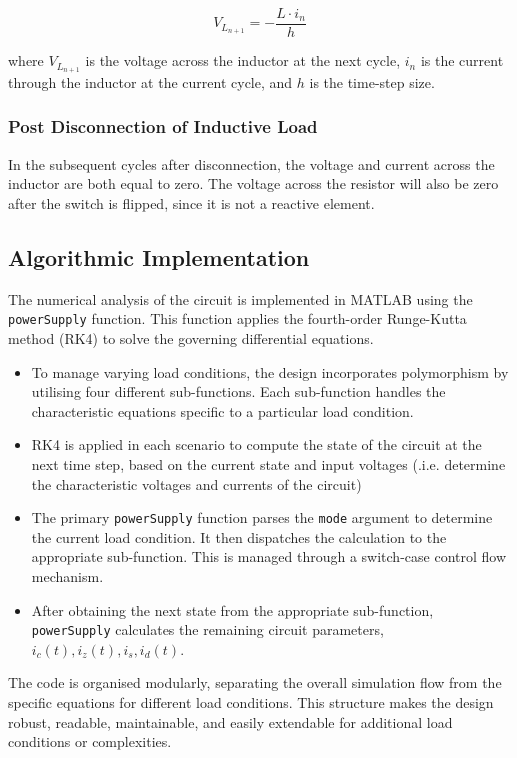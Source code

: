 \begin{equation}
V_{L_{n+1}} = - \frac{L \cdot i_{n}}{h}
\end{equation}

where $V_{L_{n+1}}$ is the voltage across the inductor at the next cycle, $i_n$ is the current through the inductor at the current cycle, and $h$ is the time-step size.

\subsubsection{Post Disconnection of Inductive Load}
In the subsequent cycles after disconnection, the voltage and current across the inductor are both equal to zero. The voltage across the resistor will also be zero after the switch is flipped, since it is not a reactive element.

\pagebreak
\subsection{Algorithmic Implementation}
The numerical analysis of the circuit is implemented in MATLAB using the \texttt{powerSupply} function. This function applies the fourth-order Runge-Kutta method (RK4) to solve the governing differential equations.
\begin{itemize}
\item To manage varying load conditions, the design incorporates polymorphism by utilising four different sub-functions. Each sub-function handles the characteristic equations specific to a particular load condition.
\item RK4 is applied in each scenario to compute the state of the circuit at the next time step, based on the current state and input voltages (.i.e. determine the characteristic voltages and currents of the circuit)
\item The primary \small{\texttt{powerSupply}} function parses the \small{\texttt{mode}} argument to determine the current load condition. It then dispatches the calculation to the appropriate sub-function. This is managed through a switch-case control flow mechanism.
\item After obtaining the next state from the appropriate sub-function, \small{\texttt{powerSupply}} calculates the remaining circuit parameters, $i_c(t), i_z(t), i_s, i_d(t)$.
\end{itemize}
The code is organised modularly, separating the overall simulation flow from the specific equations for different load conditions. This structure makes the design robust, readable, maintainable, and easily extendable for additional load conditions or complexities.

